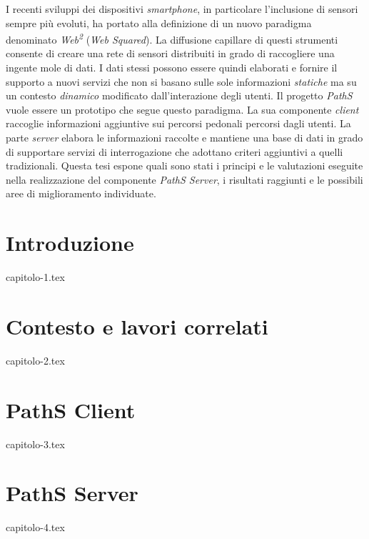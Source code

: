 \documentclass[a4paper, 12pt, twoside, openright]{book}
\newenvironment{abstract}{\cleardoublepage \null \vfill \begin{center}\bfseries\abstractname \end{center}}{\vfill\null}
\begin{document}
\begin{abstract} %
\markboth{}{} %
\thispagestyle{empty}
I recenti sviluppi dei dispositivi \emph{smartphone}, in particolare l'inclusione di sensori sempre più evoluti, ha portato alla definizione di un nuovo paradigma denominato \emph{Web\textsuperscript{2}} (\emph{Web Squared}). La diffusione capillare di questi strumenti consente di creare una rete di sensori distribuiti in grado di raccogliere una ingente mole di dati. I dati stessi possono essere quindi elaborati e fornire il supporto a nuovi servizi che non si basano sulle sole informazioni \emph{statiche} ma su un contesto \emph{dinamico} modificato dall'interazione degli utenti. Il progetto \emph{PathS} vuole essere un prototipo che segue questo paradigma. La sua componente \emph{client} raccoglie informazioni aggiuntive sui percorsi pedonali percorsi dagli utenti. La parte \emph{server} elabora le informazioni raccolte e mantiene una base di dati in grado di supportare servizi di interrogazione che adottano criteri aggiuntivi a quelli tradizionali.
Questa tesi espone quali sono stati i principi e le valutazioni eseguite nella realizzazione del componente \emph{PathS Server}, i risultati raggiunti e le possibili aree di miglioramento individuate.
\end{abstract}


\mainmatter

\chapter{Introduzione} %
\thispagestyle{empty}
{capitolo-1.tex}

\chapter{Contesto e lavori correlati} %
\thispagestyle{empty}
{capitolo-2.tex}

\chapter{PathS Client} %
\thispagestyle{empty}
{capitolo-3.tex}

\chapter{PathS Server} %
\thispagestyle{empty}
{capitolo-4.tex}
\end{document}

